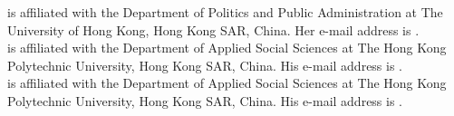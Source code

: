 \documentclass{wscpaperproc}
\begin{document}
 is affiliated with the Department of Politics and Public Administration at The University of Hong Kong, Hong Kong SAR, China. Her e-mail address is .\\

 is affiliated with the Department of Applied Social Sciences at The Hong Kong Polytechnic University, Hong Kong SAR, China. His e-mail address is .\\

 is affiliated with the Department of Applied Social Sciences at The Hong Kong Polytechnic University, Hong Kong SAR, China. His e-mail address is .
\end{document}
